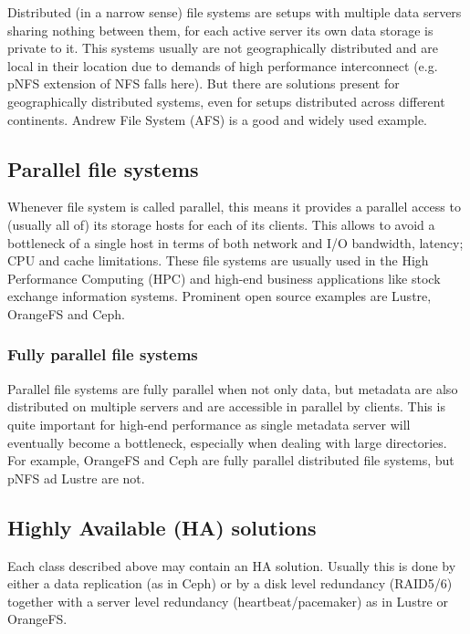 \documentclass[10pt, a5paper]{article}
\begin{document}
Distributed (in a narrow sense) file systems are setups with multiple data servers sharing nothing between them, for each active server its own data storage is private to it. This systems usually are not geographi\-cally distributed and are local in their location due to demands of high performance interconnect (e.g. pNFS\cite{bib3} extension of NFS\cite{bib2} falls here). But there are solutions present for geographically distributed systems, even for setups distributed across different continents. Andrew File System (AFS\cite{bib8}) is a good and widely used example.

\subsection*{Parallel file systems}

Whenever file system is called parallel, this means it provides a parallel access to (usually all of) its storage hosts for each of its clients. This allows to avoid a bottleneck of a single host in terms of both network and I/O bandwidth, latency; CPU and cache limitations. These file systems are usually used in the High Performance Computing \linebreak (HPC\cite{bib2}\cite{bib9}) and high-end business applications like stock exchange information systems. Prominent open source examples are Lustre\cite{bib10}, OrangeFS\cite{bib11} and Ceph\cite{bib12}.

\subsubsection*{Fully parallel file systems}

Parallel file systems are fully parallel when not only data, but meta\-data are also distributed on multiple servers and are accessible in parallel by clients. This is quite important for high-end performance as single metadata server will eventually become a bottleneck, especially when dealing with large directories. For example, OrangeFS\cite{bib11} and Ceph\cite{bib12} are fully parallel distributed file systems, but pNFS\cite{bib4} ad Lustre\cite{bib10} are not.

\subsection*{Highly Available (HA) solutions}

Each class described above may contain an HA solution. Usually this is done by either a data replication (as in Ceph\cite{bib12}) or by a disk level redundancy (RAID5/6) together with a server level redundancy (heartbeat/pacemaker) as in Lustre\cite{bib10} or OrangeFS\cite{bib11}.
\end{document}
